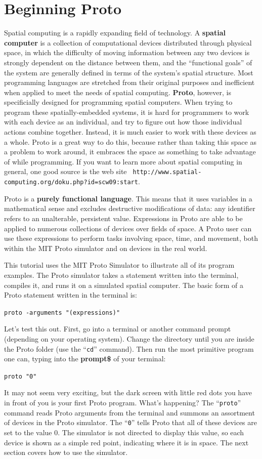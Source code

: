\documentclass{article}
\newcommand\code[1]{\begin{center}\var{#1}\end{center}}
\newcommand\var[1]{{\tt #1}}
\newcommand\qvar[1]{``{\tt #1}''}
\begin{document}
\section{Beginning Proto}

Spatial computing is a rapidly expanding field of technology.  A {\bf
  spatial computer} is a collection of computational devices
distributed through physical space, in which the difficulty of moving
information between any two devices is strongly dependent on the
distance between them, and the ``functional goals'' of the system are
generally defined in terms of the system's spatial structure.  Most
programming languages are stretched from their original purposes and
inefficient when applied to meet the needs of spatial computing.
{\bf Proto}, however, is specificially designed for programming spatial
computers.  When trying to program these spatially-embedded systems,
it is hard for programmers to work with each device as an individual,
and try to figure out how those individual actions combine together.
Instead, it is much easier to work with these devices as a whole.
Proto is a great way to do this, because rather than taking this space
as a problem to work around, it embraces the space as something to
take advantage of while programming.  If you want to learn more about
spatial computing in general, one good source is the web site {\tt
  http://www.spatial-computing.org/doku.php?id=scw09:start}.

Proto is a {\bf purely functional language}.  This means that it uses
variables in a mathematical sense and excludes destructive
modifications of data: any identifier refers to an unalterable,
persistent value.  Expressions in Proto are able to be applied to
numerous collections of devices over fields of space.  A Proto user
can use these expressions to perform tasks involving space, time, and
movement, both within the MIT Proto simulator and on devices in the
real world.

This tutorial uses the MIT Proto Simulator to illustrate all of its
program examples.  The Proto simulator takes a statement written into
the terminal, compiles it, and runs it on a simulated spatial
computer.  The basic form of a Proto statement written in the terminal is:
\code{proto -arguments "(expressions)"}
Let's test this out.  First, go into a
terminal or another command prompt (depending on your operating
system).  Change the directory until you are inside the Proto folder
(use the \qvar{cd} command).  Then run the most primitive program one can,
typing into the {\bf prompt\$} of your terminal:
\code{proto "0"}
It may not seem very exciting, but the dark screen
with little red dots you have in front of you is your first Proto
program.  What's happening?  The \qvar{proto} command reads Proto arguments
from the terminal and summons an assortment of devices in the Proto
simulator.  The \qvar{0} tells Proto that all of these devices are set to
the value 0.  The simulator is not directed to display this value, so
each device is shown as a simple red point, indicating where it is in
space.  The next section covers how to use the simulator.
\end{document}
